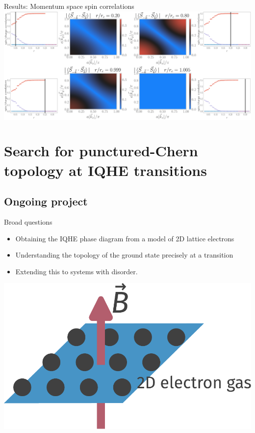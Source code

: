 \documentclass[aspectratio=169,t]{beamer}
\begin{document}
\begin{frame}{Results: Momentum space spin correlations}
\hspace*{-22pt}
\includegraphics[width=1.1\textwidth]{kspace_corr.pdf}
\end{frame}

\section{Search for punctured-Chern topology at IQHE transitions}
\subsection{Ongoing project}

\begin{frame}{Broad questions}

\vspace*{\fill}
\begin{minipage}{0.5\textwidth}
\begin{itemize}[<+->]
	\item Obtaining the \alert{IQHE phase diagram} from a model of 2D lattice electrons\\[10pt]
	\item Understanding the \alert{topology} of the ground state precisely at a transition\\[10pt]
	\item Extending this to systems with \alert{disorder}.
\end{itemize}
\end{minipage}
\hspace*{\fill}
\begin{minipage}{0.4\textwidth}
\includegraphics[width=\textwidth]{IQHE.pdf}
\end{minipage}

\vspace*{\fill}
\end{frame}
\end{document}
